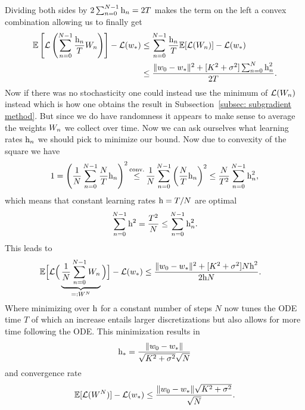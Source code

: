 Dividing both sides by \(2\sum_{n=0}^{N-1}\text{h}_n=2T\) makes the term on the left a
convex combination allowing us to finally get 
\begin{align*}
	\mathbb{E}\left[\mathcal{L}\left(\sum_{n=0}^{N-1} \frac{\text{h}_n}{T}W_n\right)\right]-\mathcal{L}(w_*)
	&\le \sum_{n=0}^{N-1} \frac{\text{h}_n}{T}\mathbb{E}[\mathcal{L}(W_n)]-\mathcal{L}(w_*)\\
	&\le \frac{
		\|w_0 - w_*\|^2 + [K^2+\sigma^2]\sum_{n=0}^N \text{h}_n^2
	}{
		2T
	}.
\end{align*}
Now if there was no stochasticity one could instead use the minimum of
\(\mathcal{L}(W_n)\) instead which is how one obtains the result in
Subsection~\ref{subsec: subgradient method}. But since we do have randomness
it appears to make sense to average the weights \(W_n\) we collect over
time.
Now we can ask ourselves what learning rates \(\text{h}_n\) we should pick to
minimize our bound. Now due to convexity of the square we have
\begin{align*}
	1 = \left(\frac{1}{N}\sum_{n=0}^{N-1}\frac{N}{T}\lr_n\right)^2
	\xle{\text{conv.}} \frac{1}{N}\sum_{n=0}^{N-1}\left(\frac{N}{T}\lr_n\right)^2
	\le \frac{N}{T^2}\sum_{n=0}^{N-1}\lr_n^2,
\end{align*}
which means that constant learning rates \(\text{h}=T/N\) are optimal
\begin{align*}
	\sum_{n=0}^{N-1}\text{h}^2 = \frac{T^2}{N} \le \sum_{n=0}^{N-1}\text{h}_n^2.
\end{align*}
This leads to
\begin{align*}
	\mathbb{E}\Big[
		\mathcal{L}\Big(\underbrace{
			\frac{1}{N}\sum_{n=0}^{N-1}W_n
		}_{=:W^N}\Big)
	\Big]-\mathcal{L}(w_*)
	&\le \frac{
		\|w_0 - w_*\|^2 + [K^2+\sigma^2]N\text{h}^2
	}{2\text{h} N}.
\end{align*}
Where minimizing over \(\text{h}\) for a constant number of steps \(N\) now tunes the
ODE time \(T\) of which an increase entails larger discretizations but also
allows for more time following the ODE.
This minimization results in
\begin{align*}
	\text{h}_* = \frac{\|w_0-w_*\|}{\sqrt{K^2+\sigma^2}\sqrt{N}}
\end{align*}
and convergence rate
\begin{align*}
	\mathbb{E}[\mathcal{L}(W^N)] -\mathcal{L}(w_*)
	\le \frac{\|w_0-w_*\|\sqrt{K^2+\sigma^2}}{\sqrt{N}}.
\end{align*}

